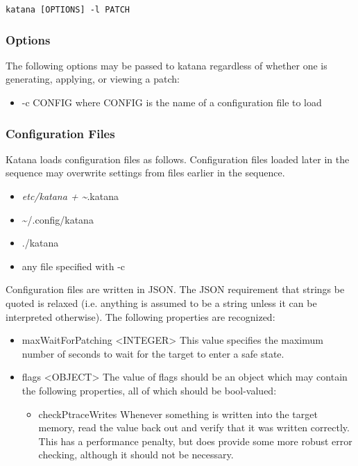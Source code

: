 \documentclass[11pt]{article}
\begin{document}
    \texttt{katana [OPTIONS] -l PATCH}
\subsubsection{Options}
\label{sec-3.5.7}

    The following options may be passed to katana regardless of whether
    one is generating, applying, or viewing a patch:
\begin{itemize}
\item -c CONFIG
      where CONFIG is the name of a configuration file to load
\end{itemize}
\subsubsection{Configuration Files}
\label{sec-3.5.8}

    Katana loads configuration files as follows. Configuration files
    loaded later in the sequence may overwrite settings from files
    earlier in the sequence.
\begin{itemize}
\item \emph{etc/katana     + \~{}}.katana
\item \~{}/.config/katana
\item ./katana
\item any file specified with -c
\end{itemize}
    Configuration files are written in JSON. The JSON requirement that
    strings be quoted is relaxed (i.e. anything is assumed to be a
    string unless it can be interpreted otherwise). The following
    properties are recognized:
\begin{itemize}
\item maxWaitForPatching <INTEGER>
      This value specifies the maximum number of seconds to wait for
      the target to enter a safe state.
\item flags <OBJECT>
      The value of flags should be an object which may contain the
      following properties, all of which should be bool-valued:

\begin{itemize}
\item checkPtraceWrites
        Whenever something is written into the target memory, read the
        value back out and verify that it was written correctly. This
        has a performance penalty, but does provide some more robust
        error checking, although it should not be necessary.
\end{itemize}

\end{itemize}
\end{document}
